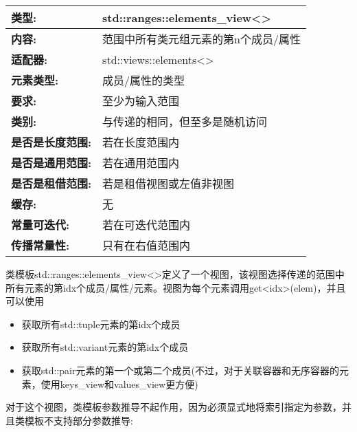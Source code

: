 
\begin{longtable}[c]{|l|l|}
\hline
\textbf{类型:}              & std::ranges::elements\_view\textless{}\textgreater{}            \\ \hline
\endfirsthead
%
\endhead
%
\textbf{内容:}           & 范围中所有类元组元素的第n个成员/属性 \\ \hline
\textbf{适配器:}           & std::views::elements\textless{}\textgreater{}                   \\ \hline
\textbf{元素类型:}         & 成员/属性的类型 \\ \hline
\textbf{要求:}             & 至少为输入范围        \\ \hline
\textbf{类别:}          & 与传递的相同，但至多是随机访问                        \\ \hline
\textbf{是否是长度范围:}       & 若在长度范围内           \\ \hline
\textbf{是否是通用范围:}      & 若在通用范围内          \\ \hline
\textbf{是否是租借范围:} & 若是租借视图或左值非视图                       \\ \hline
\textbf{缓存:}               & 无                     \\ \hline
\textbf{常量可迭代:}       & 若在可迭代范围内  \\ \hline
\textbf{传播常量性:} & 只有在右值范围内     \\ \hline
\end{longtable}

类模板std::ranges::elements\_view<>定义了一个视图，该视图选择传递的范围中所有元素的第idx个成员/属性/元素。视图为每个元素调用get<idx>(elem)，并且可以使用

\begin{itemize}
\item
获取所有std::tuple元素的第idx个成员

\item
获取所有std::variant元素的第idx个成员

\item
获取std::pair元素的第一个或第二个成员(不过，对于关联容器和无序容器的元素，使用keys\_view和values\_view更方便)
\end{itemize}

对于这个视图，类模板参数推导不起作用，因为必须显式地将索引指定为参数，并且类模板不支持部分参数推导:

